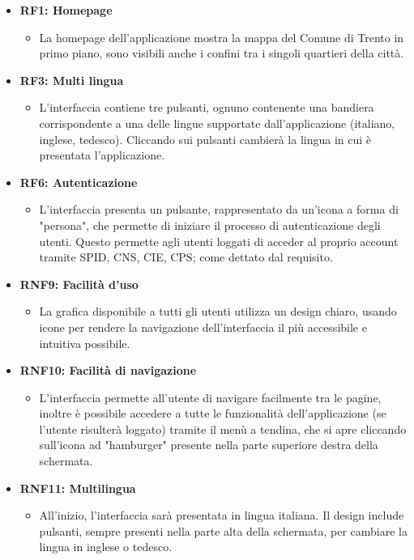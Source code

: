     \begin{itemize}
        \item \textbf{RF1: Homepage} \begin{itemize}
            \item La homepage dell'applicazione mostra la mappa del Comune di Trento in primo piano, sono visibili anche i confini tra i singoli quartieri della città.
        \end{itemize}
        \item \textbf{RF3: Multi lingua} \begin{itemize} 
                \item L'interfaccia contiene tre pulsanti, ognuno contenente una bandiera corrispondente a una delle lingue supportate dall'applicazione (italiano, inglese, tedesco). Cliccando sui pulsanti cambierà la lingua in cui è presentata l'applicazione.
        \end{itemize}
        \item \textbf{RF6: Autenticazione} \begin{itemize} 
            \item L'interfaccia presenta un pulsante, rappresentato da un'icona a forma di "persona", che permette di iniziare il processo di autenticazione degli utenti. Questo permette agli utenti loggati di acceder al proprio account tramite SPID, CNS, CIE, CPS; come dettato dal requisito.
        \end{itemize}
        \item \textbf{RNF9: Facilità d’uso} \begin{itemize}
                \item La grafica disponibile a tutti gli utenti utilizza un design chiaro, usando icone per rendere la navigazione dell'interfaccia il più accessibile e intuitiva possibile. 
        \end{itemize}
        \item \textbf{RNF10: Facilità di navigazione} \begin{itemize}
            \item L'interfaccia permette all'utente di navigare facilmente tra le pagine, inoltre è possibile accedere a tutte le funzionalità dell'applicazione (se l'utente risulterà loggato) tramite il menù a tendina, che si apre cliccando sull'icona ad "hamburger" presente nella parte superiore destra della schermata.
        \end{itemize}
        \item \textbf{RNF11: Multilingua} \begin{itemize} 
            \item All'inizio, l'interfaccia sarà presentata in lingua italiana. Il design include pulsanti, sempre presenti nella parte alta della schermata, per cambiare la lingua in inglese o tedesco.
        \end{itemize}
    \end{itemize}


